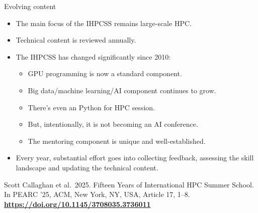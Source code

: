 \documentclass[
  11pt,
  ignorenonframetext,
  aspectratio=169,handout]{beamer}
\providecommand{\tightlist}{%
  \setlength{\itemsep}{0pt}\setlength{\parskip}{0pt}}
\begin{document}
\begin{frame}{Evolving content}
\label{evolving-content}
\begin{itemize}
\item
  The main focus of the IHPCSS remains large-scale HPC.

  \pause
\item
  Technical content is reviewed annually.

  \pause
\item
  The IHPCSS has changed significantly since 2010:

  \pause

  \begin{itemize}
  \tightlist
  \item
    GPU programming is now a standard component.
  \item
    Big data/machine learning/AI component continues to grow.
  \item
    There's even an Python for HPC session.
  \item
    But, intentionally, it is not becoming an AI conference.
  \item
    The mentoring component is unique and well-established.
  \end{itemize}

  \pause
\item
  Every year, substantial effort goes into collecting feedback, assessing the skill landscape and updating the technical content.
\end{itemize}

\pause

\small

Scott Callaghan et al.~2025. Fifteen Years of International HPC Summer School. In PEARC '25, ACM, New York, NY, USA, Article 17, 1--8. \textbf{\alert{\url{https://doi.org/10.1145/3708035.3736011}}}
\end{frame}
\end{document}
